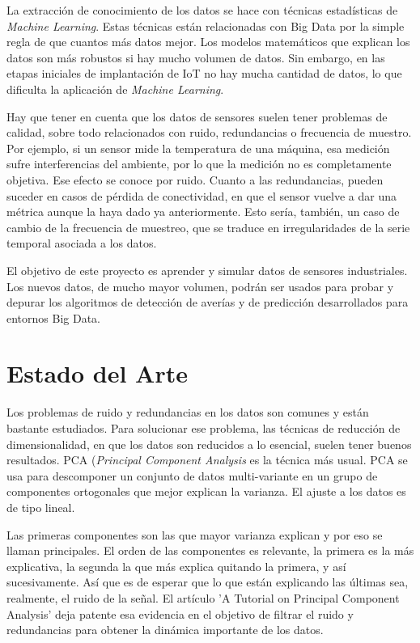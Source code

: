 \documentclass[11pt,spanish,listoffigures,listoftables]{tfgetsinf}
\begin{document}
La extracción de conocimiento de los datos se hace con técnicas estadísticas de {\em Machine Learning}. Estas técnicas están relacionadas con Big Data por la simple regla de que cuantos más datos mejor. Los modelos matemáticos que explican los datos son más robustos si hay mucho volumen de datos. Sin embargo, en las etapas iniciales de implantación de IoT no hay mucha cantidad de datos, lo que dificulta la aplicación de {\em Machine Learning}.

Hay que tener en cuenta que los datos de sensores suelen tener problemas de calidad, sobre todo relacionados con ruido, redundancias o frecuencia de muestro. Por ejemplo, si un sensor mide la temperatura de una máquina, esa medición sufre interferencias del ambiente, por lo que la medición no es completamente objetiva. Ese efecto se conoce por ruido. Cuanto a las redundancias, pueden suceder en casos de pérdida de conectividad, en que el sensor vuelve a dar una métrica aunque la haya dado ya anteriormente. Esto sería, también, un caso de cambio de la frecuencia de muestreo, 	que se traduce en irregularidades de la serie temporal asociada a los datos. 

El objetivo de este proyecto es aprender y simular datos de sensores industriales. Los nuevos datos, de mucho mayor volumen, podrán ser usados para probar y depurar los algoritmos de detección de averías y de predicción desarrollados para entornos Big Data. 

\chapter{Estado del Arte}
Los problemas de ruido y redundancias en los datos son comunes y están bastante estudiados. Para solucionar ese problema, las técnicas de reducción de dimensionalidad, en que los datos son reducidos a lo esencial, suelen tener buenos resultados. PCA ({\em Principal Component Analysis} es la técnica más usual. PCA se usa para descomponer un conjunto de datos multi-variante en un grupo de componentes ortogonales que mejor explican la varianza. El ajuste a los datos es de tipo lineal.

Las primeras componentes son las que mayor varianza explican y por eso se llaman principales. El orden de las componentes es relevante, la primera es la más explicativa, la segunda la que más explica quitando la primera, y así sucesivamente. Así que es de esperar que lo que están explicando las últimas sea, realmente, el ruido de la señal. El artículo 'A Tutorial on Principal Component Analysis' deja patente esa evidencia en el objetivo de filtrar el ruido y redundancias para obtener la dinámica importante de los datos.
\end{document}
